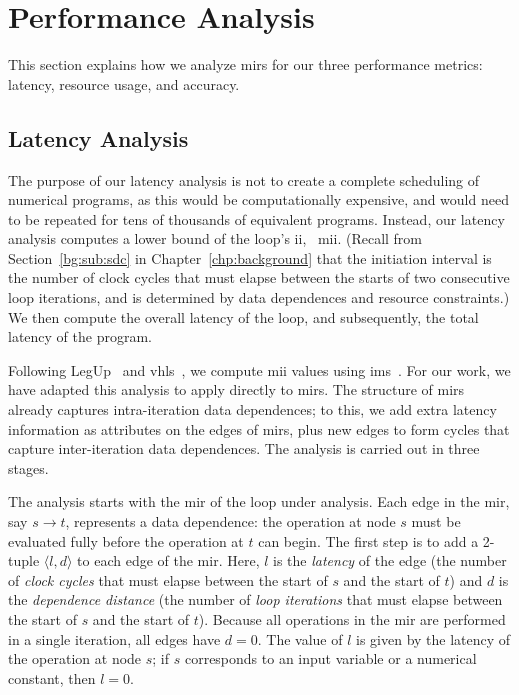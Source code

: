 \section{Performance Analysis}
\label{lo:sec:performance_analysis}

This section explains how we analyze \glspl{mir} for our three performance
metrics: latency, resource usage, and accuracy.

\subsection{Latency Analysis}
\label{lo:sub:latency_analysis}

The purpose of our latency analysis is not to create a complete scheduling of
numerical programs, as this would be computationally expensive, and would need
to be repeated for tens of thousands of equivalent programs.  Instead, our
latency analysis computes a lower bound of the loop's \gls{ii}, \ie~\gls{mii}.
(Recall from Section~\ref{bg:sub:sdc} in Chapter~\ref{chp:background} that the
initiation interval is the number of clock cycles that must elapse between
the starts of two consecutive loop iterations, and is determined by data
dependences and resource constraints.)  We then compute the overall latency of
the loop, and subsequently, the total latency of the program.

Following LegUp~\cite{legup} and \gls{vhls}~\cite{vivado_hls}, we compute
\gls{mii} values using \gls{ims}~\cite{rau94}. For our work, we have adapted
this analysis to apply directly to \glspl{mir}. The structure of \glspl{mir}
already captures intra-iteration data dependences; to this, we add extra
latency information as attributes on the edges of \glspl{mir}, plus new edges
to form cycles that capture inter-iteration data dependences.  The analysis is
carried out in three stages.

The analysis starts with the \gls{mir} of the loop under analysis. Each edge
in the \gls{mir}, say $s\rightarrow t$, represents a data dependence: the
operation at node $s$ must be evaluated fully before the operation at $t$
can begin. The first step is to add a 2-tuple $\langle l, d \rangle$ to each
edge of the \gls{mir}\@. Here, $l$ is the \emph{latency} of the edge (the
number of \emph{clock cycles} that must elapse between the start of $s$ and
the start of $t$) and $d$ is the \emph{dependence distance} (the number of
\emph{loop iterations} that must elapse between the start of $s$ and the start
of $t$). Because all operations in the \gls{mir} are performed in a single
iteration, all edges have $d=0$. The value of $l$ is given by the latency
of the operation at node $s$; if $s$ corresponds to an input variable or a
numerical constant, then $l=0$.

